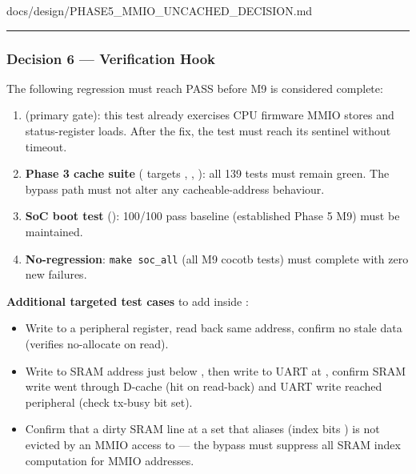 \begin{relocated}{docs/design/PHASE5_MMIO_UNCACHED_DECISION.md}
\begin{center}\rule{0.5\linewidth}{0.5pt}\end{center}

\subsubsection{Decision 6 --- Verification Hook}\label{ds:dec:phase5-mmio-uncached:decision-6-verification-hook}

The following regression must reach PASS before M9 is considered
complete:

\begin{enumerate}
\def\labelenumi{\arabic{enumi}.}
\item
  \textbf{} (primary gate):
  this test already exercises CPU firmware MMIO stores and
  status-register loads. After the fix, the test must reach its
   sentinel without timeout.
\item
  \textbf{Phase 3 cache suite} ( targets
  , , ): all
  139 tests must remain green. The bypass path must not alter any
  cacheable-address behaviour.
\item
  \textbf{SoC boot test} (): 100/100
  pass baseline (established Phase 5 M9) must be maintained.
\item
  \textbf{No-regression}: \texttt{make\ soc\_\allowbreak{}all} (all M9
  cocotb tests) must complete with zero new failures.
\end{enumerate}

\textbf{Additional targeted test cases} to add inside
:

\begin{itemize}
\tightlist
\item
  Write to a peripheral register, read back same address, confirm no
  stale data (verifies no-allocate on read).
\item
  Write to SRAM address just below , then write to
  UART at , confirm SRAM write went through D-cache
  (hit on read-back) and UART write reached peripheral (check tx-busy
  bit set).
\item
  Confirm that a dirty SRAM line at a set that aliases
   (index bits \code{[11:4]}) is not evicted by an
  MMIO access to  --- the bypass must suppress all
  SRAM index computation for MMIO addresses.
\end{itemize}


\end{relocated}
